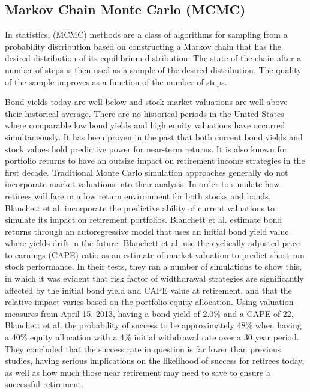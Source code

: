 \subsection{Markov Chain Monte Carlo (MCMC)}

In statistics, (MCMC) methods are a class of algorithms for sampling from a probability distribution based on constructing a Markov chain that has the desired distribution of its equilibrium distribution. The state of the chain after a number of steps is then used as a sample of the desired distribution. The quality of the sample improves as a function of the number of steps.

Bond yields today are well below and stock market valuations are well above their historical average.\cite{Blanchett:2013aa} There are no historical periods in the United States where comparable low bond yields and high equity valuations have occurred simultaneously. It has been proven in the past that both current bond yields and stock values hold predictive power for near-term returns. It is also known for portfolio returns to have an outsize impact on retirement income strategies in the first decade. Traditional Monte Carlo simulation approaches generally do not incorporate market valuations into their analysis. In order to simulate how retirees will fare in a low return environment for both stocks and bonds, Blanchett et al. incorporate the predictive ability of current valuations to simulate its impact on retirement portfolios. Blanchett et al. estimate bond returns through an autoregressive model that uses an initial bond yield value where yields drift in the future. Blanchett et al. use the cyclically adjusted price-to-earnings (CAPE) ratio as an estimate of market valuation to predict short-run stock performance. In their tests, they ran a number of simulations to show this, in which it was evident that risk factor of widthdrawal strategies are significantly affected by the initial bond yield and CAPE value at retirement, and that the relative impact varies based on the portfolio equity allocation. Using valuation measures from April 15, 2013, having a bond yield of 2.0\% and a CAPE of 22, Blanchett et al. the probability of success to be approximately 48\% when having a 40\% equity allocation with a 4\% initial withdrawal rate over a 30 year period. They concluded that the success rate in question is far lower than previous studies, having serious implications on the likelihood of success for retirees today, as well as how much those near retirement may need to save to ensure a successful retirement.

